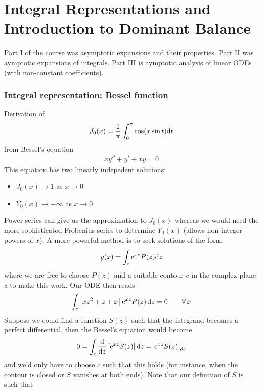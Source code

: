\newpage
\chapter[Integral Representation \& dominant balance]{Integral Representations and Introduction to Dominant Balance}

Part I of the course was asymptotic expansions and their properties. Part II was aymptotic expansions of integrals. Part III is aymptotic analysis of linear ODEs (with non-constant coefficients). 

\subsection*{Integral representation: Bessel function}\label{sec:Bessel-integral-form}
Derivation of 
\begin{gather*}
	J_0(x) = \frac{1}{\pi} \int_{0}^{\pi} \cos (x \sin t) \mathrm{d} t
\end{gather*}
from Bessel's equation
\begin{gather*}
	xy'' + y' + xy = 0
\end{gather*}
This equation has two linearly indepedent solutions:
\begin{itemize}
	\item $J_0(x)\rightarrow 1$ as $x \rightarrow 0$
	\item $Y_0(x)\rightarrow -\infty$ as $x \rightarrow 0$
\end{itemize}
Power series can give us the approximation to $J_0(x)$ whereas we would need the more sophisticated Frobenius series to determine $Y_0(x)$ (allows non-integer powers of $x$). A more powerful method is to seek solutions of the form 
\begin{gather*}
	y(x) = \int_c \mathrm{e}^{xz} P(z) \mathrm{d} z
\end{gather*}
where we are free to choose $P(z)$ and a suitable contour $c$ in the complex plane $z$ to make this work. Our ODE then reads
\begin{align*}
\int_c \left[x z^2 + z + x\right] \mathrm{e}^{xz}P(z) \, \mathrm{d} z = 0 \qquad \forall \, x
\end{align*}
Suppose we could find a function $S(z)$ such that the integrand becomes a perfect differential, then the Bessel's equation would become
\begin{gather*}
	0 = \int_c 	\frac{\mathrm{d}}{\mathrm{d} z} \left[\mathrm{e}^{xz} S(z)\right] \mathrm{d} z = \left.\mathrm{e}^{xz} S(z) \right|_{\partial c}
\end{gather*}
and we'd only have to choose $c$ such that this holds (for instance, when the contour is closed or $S$ vanishes at both ends). Note that our definition of $S$ is such that
